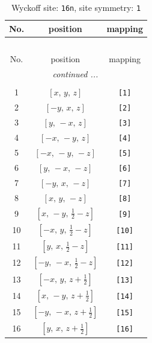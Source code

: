 \documentclass[fleqn,8pt]{jsarticle}
\begin{document}
\begin{longtable}{ccc}
\caption{Wyckoff site: {\tt 16n}, site symmetry: {\tt 1}}
 \\
 \hline \hline
No. & position & mapping \\ \hline \endfirsthead

\multicolumn{2}{l}{\tablename\ \thetable{}} \\
 \hline \hline
No. & position & mapping \\ \hline \endhead

 \hline \hline
\multicolumn{2}{r}{\footnotesize\it continued ...} \\ \endfoot

 \hline \hline
\multicolumn{2}{r}{} \\ \endlastfoot

1 & $\left[ x,\, y,\, z \right]$ & {\tt [1]} \\ \hline
2 & $\left[ - y,\, x,\, z \right]$ & {\tt [2]} \\ \hline
3 & $\left[ y,\, - x,\, z \right]$ & {\tt [3]} \\ \hline
4 & $\left[ - x,\, - y,\, z \right]$ & {\tt [4]} \\ \hline
5 & $\left[ - x,\, - y,\, - z \right]$ & {\tt [5]} \\ \hline
6 & $\left[ y,\, - x,\, - z \right]$ & {\tt [6]} \\ \hline
7 & $\left[ - y,\, x,\, - z \right]$ & {\tt [7]} \\ \hline
8 & $\left[ x,\, y,\, - z \right]$ & {\tt [8]} \\ \hline
9 & $\left[ x,\, - y,\, \frac{1}{2} - z \right]$ & {\tt [9]} \\ \hline
10 & $\left[ - x,\, y,\, \frac{1}{2} - z \right]$ & {\tt [10]} \\ \hline
11 & $\left[ y,\, x,\, \frac{1}{2} - z \right]$ & {\tt [11]} \\ \hline
12 & $\left[ - y,\, - x,\, \frac{1}{2} - z \right]$ & {\tt [12]} \\ \hline
13 & $\left[ - x,\, y,\, z + \frac{1}{2} \right]$ & {\tt [13]} \\ \hline
14 & $\left[ x,\, - y,\, z + \frac{1}{2} \right]$ & {\tt [14]} \\ \hline
15 & $\left[ - y,\, - x,\, z + \frac{1}{2} \right]$ & {\tt [15]} \\ \hline
16 & $\left[ y,\, x,\, z + \frac{1}{2} \right]$ & {\tt [16]} \\
\end{longtable}
\end{document}
